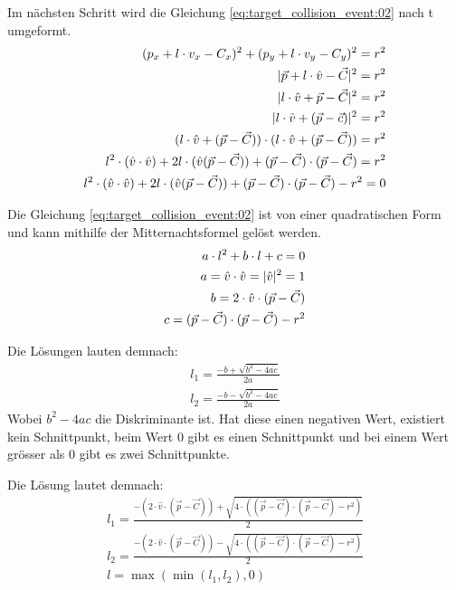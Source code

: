Im nächsten Schritt wird die Gleichung \ref{eq:target_collision_event:02} nach t umgeformt.
\begin{align}
    (p_x + l \cdot v_x - C_x)^2 + (p_y + l \cdot v_y - C_y)^2 = r^2\\
    \lvert \vec{p} + l \cdot \hat{v} - \vec{C} \rvert^2 = r^2\\
    \lvert l \cdot \hat{v} + \vec{p} - \vec{C} \rvert^2 = r^2\\
    \lvert l \cdot \hat{v} + (\vec{p} - \vec{c}) \rvert^2 = r^2\\
    (l \cdot \hat{v} + (\vec{p} - \vec{C})) \cdot (l \cdot \hat{v} + (\vec{p} - \vec{C})) = r^2\\
    l^2 \cdot (\hat{v} \cdot \hat{v}) + 2l \cdot (\hat{v}(\vec{p} - \vec{C})) + (\vec{p} - \vec{C}) \cdot (\vec{p} - \vec{C}) = r^2\\
    l^2 \cdot (\hat{v} \cdot \hat{v}) + 2l \cdot (\hat{v}(\vec{p} - \vec{C})) + (\vec{p} - \vec{C}) \cdot (\vec{p} - \vec{C}) - r^2 = 0\label{eq:target_collision_event:03}
\end{align}

Die Gleichung \ref{eq:target_collision_event:02} ist von einer quadratischen Form und kann mithilfe der Mitternachtsformel
gelöst werden.
\begin{align}
    a \cdot l^2 + b \cdot l + c = 0\\
    a = \hat{v} \cdot \hat{v} = \lvert \hat{v} \rvert^2 = 1\\
    b = 2 \cdot \hat{v} \cdot (\vec{p} - \vec{C})\\
    c = (\vec{p} - \vec{C}) \cdot (\vec{p} - \vec{C}) - r^2
\end{align}

Die Lösungen lauten demnach:
\begin{align}
    l_1 = \frac{-b + \sqrt{b^2 - 4ac}}{2a}\\
    l_2 = \frac{-b - \sqrt{b^2 - 4ac}}{2a}
\end{align}
Wobei $b^2 - 4ac$ die Diskriminante ist. Hat diese einen negativen Wert, existiert kein Schnittpunkt,
beim Wert $0$ gibt es einen Schnittpunkt und bei einem Wert grösser als $0$ gibt es zwei Schnittpunkte.

Die Lösung lautet demnach:
\begin{align}
    l_1 = \frac{-(2 \cdot \hat{v} \cdot (\vec{p} - \vec{C})) + \sqrt{4 \cdot ((\vec{p} - \vec{C}) \cdot (\vec{p} - \vec{C}) - r^2)}}{2}\\
    l_2 = \frac{-(2 \cdot \hat{v} \cdot (\vec{p} - \vec{C})) - \sqrt{4 \cdot ((\vec{p} - \vec{C}) \cdot (\vec{p} - \vec{C}) - r^2)}}{2}\\
    l = \max{(\min{(l_1, l_2)}, 0)}
\end{align}

